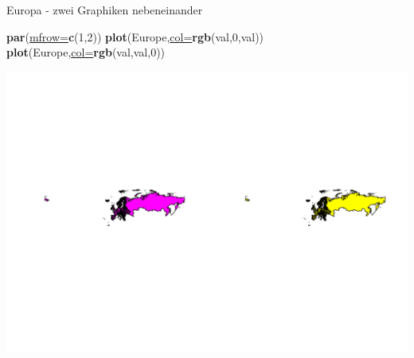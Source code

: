 \documentclass[ignorenonframetext,]{beamer}
\newenvironment{Shaded}{\begin{snugshade}}{\end{snugshade}}
\newcommand{\DataTypeTok}[1]{\textcolor[rgb]{0.74,0.68,0.62}{\underline{#1}}}
\newcommand{\DecValTok}[1]{\textcolor[rgb]{0.27,0.67,0.26}{#1}}
\newcommand{\KeywordTok}[1]{\textcolor[rgb]{0.26,0.66,0.93}{\textbf{#1}}}
\newcommand{\NormalTok}[1]{\textcolor[rgb]{0.74,0.68,0.62}{#1}}
\begin{document}
\begin{frame}[fragile]{Europa - zwei Graphiken nebeneinander}
\protect\hypertarget{europa---zwei-graphiken-nebeneinander}{}

\begin{Shaded}
\begin{Highlighting}[]
\KeywordTok{par}\NormalTok{(}\DataTypeTok{mfrow=}\KeywordTok{c}\NormalTok{(}\DecValTok{1}\NormalTok{,}\DecValTok{2}\NormalTok{))}
\KeywordTok{plot}\NormalTok{(Europe,}\DataTypeTok{col=}\KeywordTok{rgb}\NormalTok{(val,}\DecValTok{0}\NormalTok{,val))}
\KeywordTok{plot}\NormalTok{(Europe,}\DataTypeTok{col=}\KeywordTok{rgb}\NormalTok{(val,val,}\DecValTok{0}\NormalTok{))}
\end{Highlighting}
\end{Shaded}

\includegraphics{Geomedizin_files/figure-beamer/unnamed-chunk-83-1.pdf}

\end{frame}
\end{document}

